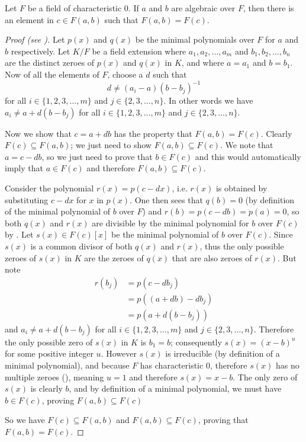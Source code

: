 \begin{theorem}\label{thrm-two-elem-adjoined-convert-to-simple-extension}
    Let $F$ be a field of characteristic 0. If $a$ and $b$ are algebraic over $F$, then there is an element in $c \in F(a,b)$ such that $F(a,b) = F(c)$.
\end{theorem}
\begin{proof}[Proof (see {\cite[Theorem 21.6]{gallian_2016}})]
    Let $p(x)$ and $q(x)$ be the minimal polynomials over $F$ for $a$ and $b$ respectively. Let $K/F$ be a field extension where $a_1, a_2, \dots, a_m$ and $b_1, b_2, \dots, b_n$ are the distinct zeroes of $p(x)$ and $q(x)$ in $K$, and where $a = a_1$ and $b = b_1$. Now of all the elements of $F$, choose a $d$ such that
    \[
        d \neq (a_i-a)(b-b_j)^{-1}
    \]
    for all $i \in \{1, 2, 3, \dots, m\}$ and $j \in \{2, 3, \dots, n\}$. In other words we have $a_i \neq a + d(b-b_j)$ for all $i \in \{1, 2, 3, \dots, m\}$ and $j \in \{2, 3, \dots, n\}$.

    Now we show that $c = a + db$ has the property that $F(a, b) = F(c)$. Clearly $F(c) \subseteq F(a, b)$; we just need to show $F(a, b) \subseteq F(c)$. We note that $a = c - db$, so we just need to prove that $b \in F(c)$ and this would automatically imply that $a \in F(c)$ and therefore $F(a,b) \subseteq F(c)$.

    Consider the polynomial $r(x) = p(c - dx)$, i.e. $r(x)$ is obtained by substituting $c - dx$ for $x$ in $p(x)$. One then sees that $q(b) = 0$ (by definition of the minimal polynomial of $b$ over $F$) and $r(b) = p(c - db) = p(a) = 0$, so both $q(x)$ and $r(x)$ are divisible by the minimal polynomial for $b$ over $F(c)$ by . Let $s(x) \in F(c)[x]$ be the minimal polynomial of $b$ over $F(c)$. Since $s(x)$ is a common divisor of both $q(x)$ and $r(x)$, thus the only possible zeroes of $s(x)$ in $K$ are the zeroes of $q(x)$ that are also zeroes of $r(x)$. But note
    \begin{align*}
        r(b_j) &= p(c-db_j)\\
        &= p((a+db) - db_j)\\
        &= p(a+d(b-b_j))
    \end{align*}
    and $a_i \neq a+d(b-b_j)$ for all $i \in \{1, 2, 3, \dots, m\}$ and $j \in \{2, 3, \dots, n\}$. Therefore the only possible zero of $s(x)$ in $K$ is $b_1 = b$; consequently $s(x) = (x-b)^u$ for some positive integer $u$. However $s(x)$ is irreducible (by definition of a minimal polynomial), and because $F$ has characteristic 0, therefore $s(x)$ has no multiple zeroes (), meaning $u = 1$ and therefore $s(x) = x-b$. The only zero of $s(x)$ is clearly $b$, and by definition of a minimal polynomial, we must have $b \in F(c)$, proving $F(a, b) \subseteq F(c)$

    So we have $F(c) \subseteq F(a, b)$ and $F(a, b) \subseteq F(c)$, proving that $F(a, b) = F(c)$.
\end{proof}

